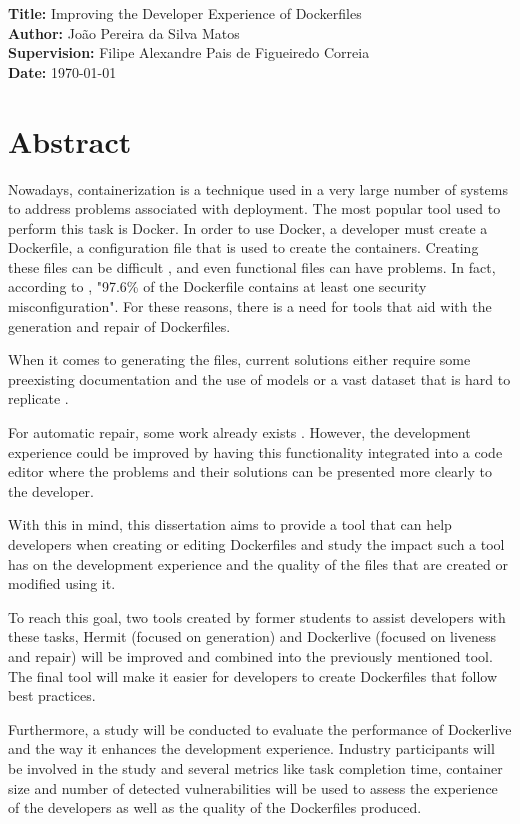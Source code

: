 \documentclass[11pt,a4paper]{article}
\newcommand{\titles}[2]{\noindent\textbf{#1:} #2\\[2mm]}
\begin{document}
\titles{Title}{Improving the Developer Experience of Dockerfiles}
\titles{Author}{João Pereira da Silva Matos}
\titles{Supervision}{Filipe Alexandre Pais de Figueiredo Correia}
\titles{Date}{\today}

\section*{Abstract}

Nowadays, containerization is a technique used in a very large number of systems to address problems associated with deployment. The most popular tool used to perform this task is Docker. In order to use Docker, a developer must create a Dockerfile, a configuration file that is used to create the containers. Creating these files can be difficult \cite{reisLiveDockerContainers2020}, and even functional files can have problems. In fact, according to \cite{prinettoSecurityMisconfigurationsDetection}, "97.6\% of the Dockerfile contains at least one security misconfiguration". For these reasons, there is a need for tools that aid with the generation and repair of Dockerfiles.

When it comes to generating the files, current solutions either require some preexisting documentation and the use of models \cite{tomyModusDatalogDialect2022} or a vast dataset that is hard to replicate \cite{yeDockerGenKnowledgeGraph2021a}.

For automatic repair, some work already exists \cite{henkelShipwrightHumanintheLoopSystem2021}. However, the development experience could be improved by having this functionality integrated into a code editor where the problems and their solutions can be presented more clearly to the developer.

With this in mind, this dissertation aims to provide a tool that can help developers when creating or editing Dockerfiles and study the impact such a tool
has on the development experience and the quality of the files that are created or modified using it.

To reach this goal, two tools created by former students to assist developers with these tasks, Hermit \cite{maduroAutomaticServiceContainerization2021} (focused on generation) and Dockerlive \cite{reisLiveDockerContainers2020} (focused on liveness and repair) will be improved and combined into the previously mentioned tool. The final tool will make it easier for developers to create Dockerfiles that follow best practices.

Furthermore, a study will be conducted to evaluate the performance of Dockerlive and the way it enhances the development experience. Industry participants will be involved in the study and several metrics like task completion time, container size and number of detected vulnerabilities will be used to assess the experience of the developers as well as the quality of the Dockerfiles produced.
\end{document}
